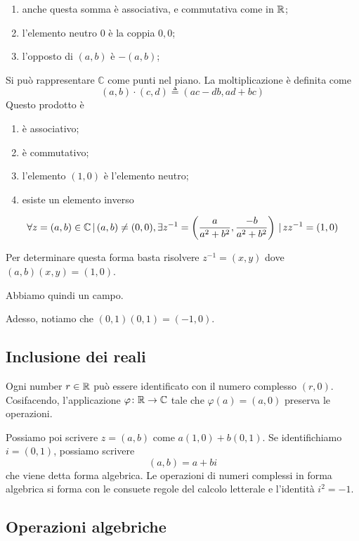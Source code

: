 \documentclass[a4paper]{article}
\begin{document}
\begin{enumerate}
    \item anche questa somma è associativa, e commutativa come in \(\mathbb{R}\);
    \item l'elemento neutro \(0\) è la coppia \(0,0\);
    \item l'opposto di \((a,b)\) è \(-(a,b)\);
\end{enumerate}

Si può rappresentare \(\mathbb{C}\) come punti nel piano.
La moltiplicazione è definita come
\[
    (a,b) \cdot (c,d) \triangleq (ac-db,ad+bc)
\]
Questo prodotto è
\begin{enumerate}
    \item è associativo;
    \item è commutativo;
    \item l'elemento \((1,0)\) è l'elemento neutro;
    \item esiste un elemento inverso
\end{enumerate}

\[
    \forall z=(a,b) \in \mathbb{C} \,|\, (a,b) \neq (0,0),
    \exists z^{-1} = \left(\frac{a}{a^2 + b^2}, \frac{-b}{a^2 + b^2}\right) \,|\,
    zz^{-1} = (1,0)
\]

Per determinare questa forma basta risolvere \(z^{-1} = (x,y)\) dove \((a,b)(x,y) = (1,0)\).

Abbiamo quindi un campo.

Adesso, notiamo che \((0,1)(0,1) = (-1, 0)\).

\subsection{Inclusione dei reali}

Ogni number \(r\in\mathbb{R}\) può essere identificato con il numero complesso \((r, 0)\).
Cosifacendo, l'applicazione \(\varphi\colon \mathbb{R} \to \mathbb{C}\)
tale che \(\varphi(a) = (a,0)\) preserva le operazioni.

Possiamo poi scrivere \(z=(a,b)\) come \(a(1,0) + b(0,1)\).
Se identifichiamo \(i=(0,1)\), possiamo scrivere
\[
    (a,b) = a+bi
\]
che viene detta forma algebrica.
Le operazioni di numeri complessi in forma algebrica si forma con le consuete regole del calcolo letterale
e l'identità \(i^2 = -1\).

\subsection{Operazioni algebriche}
\end{document}
